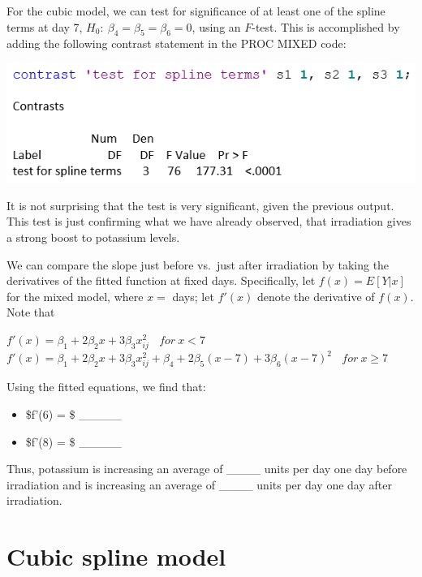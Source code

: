 \documentclass[
  9pt,
  ignorenonframetext,
]{beamer}
\providecommand{\tightlist}{%
  \setlength{\itemsep}{0pt}\setlength{\parskip}{0pt}}
\begin{document}
\begin{frame}{}
\protect\hypertarget{section-9}{}
For the cubic model, we can test for significance of at least one of the
spline terms at day 7, \(H_0:\  \beta_4=\beta_5=\beta_6=0\), using an
\(F\)-test. This is accomplished by adding the following contrast
statement in the PROC MIXED code:

\begin{center}\includegraphics[width=0.3\linewidth]{figs_L12/f13} \end{center}

It is not surprising that the test is very significant, given the
previous output. This test is just confirming what we have already
observed, that irradiation gives a strong boost to potassium levels.

We can compare the slope just before vs.~just after irradiation by
taking the derivatives of the fitted function at fixed days.
Specifically, let \(f(x) = E[Y|x]\) for the mixed model, where \(x =\)
days; let \(f'(x)\) denote the derivative of \(f(x)\). Note that

\(f'(x)=\beta_1+2\beta_2 x+3\beta_3 x_{ij}^2\ \ \ \ for\ x<7\)
\(f'(x)=\beta_1+2\beta_2 x+3\beta_3 x_{ij}^2+\beta_4+2\beta_5 (x-7)+3\beta_6 (x-7)^2 \ \ \ \ for\ x \geq 7\)

Using the fitted equations, we find that:

\begin{itemize}
\tightlist
\item
  \$f'(6) = \$ \_\_\_\_\_
\item
  \$f'(8) = \$ \_\_\_\_\_
\end{itemize}

Thus, potassium is increasing an average of \_\_\_\_ units per day one
day before irradiation and is increasing an average of \_\_\_\_ units
per day one day after irradiation.
\end{frame}

\hypertarget{cubic-spline-model}{%
\section{Cubic spline model}\label{cubic-spline-model}}
\end{document}
